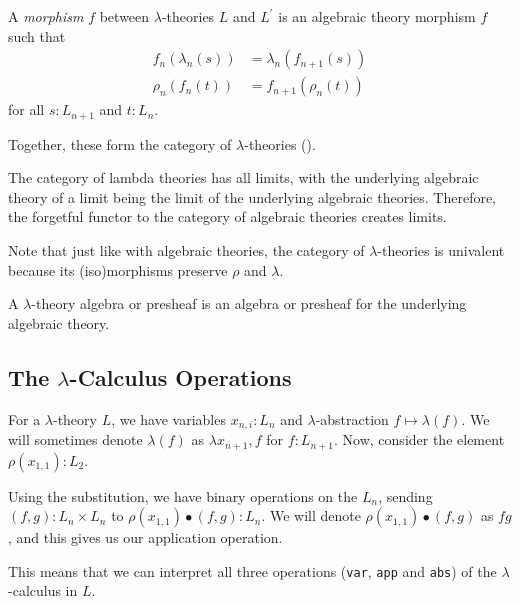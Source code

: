 \begin{definition}
  A \textit{morphism} $ f $ between $ \lambda $-theories $ L $ and $ L^\prime $ is an algebraic theory morphism $ f $ such that
  \begin{align*}
    f_n(\lambda_n(s)) &= \lambda_n(f_{n + 1}(s))\\
    \rho_n(f_n(t)) &= f_{n + 1}(\rho_n(t))
  \end{align*}
  for all $ s: L_{n + 1} $ and $ t: L_n $.
\end{definition}

Together, these form the category of $ \lambda $-theories \iindex{$ \LamTh $} ().

\begin{lemma}
  The category of lambda theories has all limits, with the underlying algebraic theory of a limit being the limit of the underlying algebraic theories. Therefore, the forgetful functor to the category of algebraic theories creates limits.
\end{lemma}

\begin{lemma}
  Note that just like with algebraic theories, the category of $ \lambda $-theories is univalent because its (iso)morphisms preserve $ \rho $ and $ \lambda $.
\end{lemma}

\begin{definition}
  A $ \lambda $-theory algebra or presheaf is an algebra or presheaf for the underlying algebraic theory.
\end{definition}

\subsection{The $ \lambda $-Calculus Operations}\label{subsec:lambda-calculus-operations}
For a $ \lambda $-theory $ L $, we have variables $ x_{n, i} : L_n $ and $ \lambda $-abstraction $ f \mapsto \lambda(f) $. We will sometimes denote $ \lambda(f) $ as $ \lambda x_{n + 1}, f $ for $ f: L_{n + 1} $. Now, consider the element $ \rho(x_{1, 1}) : L_2 $.
\begin{definition}
  Using the substitution, we have binary operations on the $ L_n $, sending $ (f, g) : L_n \times L_n $ to $ \rho(x_{1, 1}) \bullet (f, g) : L_n $. We will denote $ \rho(x_{1, 1}) \bullet (f, g) $ as $ f g $, and this gives us our application operation.
\end{definition}
This means that we can interpret all three operations (\texttt{var}, \texttt{app} and \texttt{abs}) of the $ \lambda $-calculus in $ L $.

